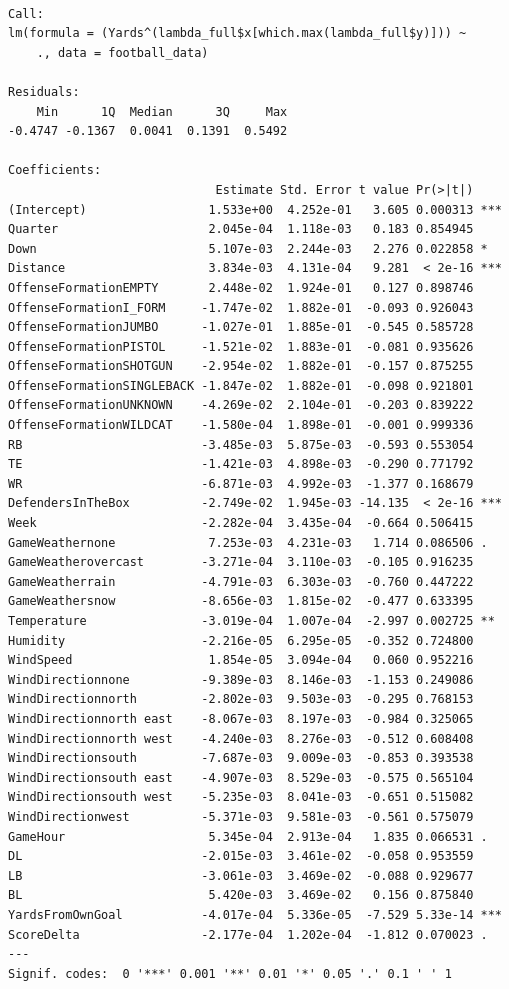 \documentclass[
  super,
  preprint,
  3p]{elsarticle}
\begin{document}
\begin{verbatim}

Call:
lm(formula = (Yards^(lambda_full$x[which.max(lambda_full$y)])) ~ 
    ., data = football_data)

Residuals:
    Min      1Q  Median      3Q     Max 
-0.4747 -0.1367  0.0041  0.1391  0.5492 

Coefficients:
                             Estimate Std. Error t value Pr(>|t|)    
(Intercept)                 1.533e+00  4.252e-01   3.605 0.000313 ***
Quarter                     2.045e-04  1.118e-03   0.183 0.854945    
Down                        5.107e-03  2.244e-03   2.276 0.022858 *  
Distance                    3.834e-03  4.131e-04   9.281  < 2e-16 ***
OffenseFormationEMPTY       2.448e-02  1.924e-01   0.127 0.898746    
OffenseFormationI_FORM     -1.747e-02  1.882e-01  -0.093 0.926043    
OffenseFormationJUMBO      -1.027e-01  1.885e-01  -0.545 0.585728    
OffenseFormationPISTOL     -1.521e-02  1.883e-01  -0.081 0.935626    
OffenseFormationSHOTGUN    -2.954e-02  1.882e-01  -0.157 0.875255    
OffenseFormationSINGLEBACK -1.847e-02  1.882e-01  -0.098 0.921801    
OffenseFormationUNKNOWN    -4.269e-02  2.104e-01  -0.203 0.839222    
OffenseFormationWILDCAT    -1.580e-04  1.898e-01  -0.001 0.999336    
RB                         -3.485e-03  5.875e-03  -0.593 0.553054    
TE                         -1.421e-03  4.898e-03  -0.290 0.771792    
WR                         -6.871e-03  4.992e-03  -1.377 0.168679    
DefendersInTheBox          -2.749e-02  1.945e-03 -14.135  < 2e-16 ***
Week                       -2.282e-04  3.435e-04  -0.664 0.506415    
GameWeathernone             7.253e-03  4.231e-03   1.714 0.086506 .  
GameWeatherovercast        -3.271e-04  3.110e-03  -0.105 0.916235    
GameWeatherrain            -4.791e-03  6.303e-03  -0.760 0.447222    
GameWeathersnow            -8.656e-03  1.815e-02  -0.477 0.633395    
Temperature                -3.019e-04  1.007e-04  -2.997 0.002725 ** 
Humidity                   -2.216e-05  6.295e-05  -0.352 0.724800    
WindSpeed                   1.854e-05  3.094e-04   0.060 0.952216    
WindDirectionnone          -9.389e-03  8.146e-03  -1.153 0.249086    
WindDirectionnorth         -2.802e-03  9.503e-03  -0.295 0.768153    
WindDirectionnorth east    -8.067e-03  8.197e-03  -0.984 0.325065    
WindDirectionnorth west    -4.240e-03  8.276e-03  -0.512 0.608408    
WindDirectionsouth         -7.687e-03  9.009e-03  -0.853 0.393538    
WindDirectionsouth east    -4.907e-03  8.529e-03  -0.575 0.565104    
WindDirectionsouth west    -5.235e-03  8.041e-03  -0.651 0.515082    
WindDirectionwest          -5.371e-03  9.581e-03  -0.561 0.575079    
GameHour                    5.345e-04  2.913e-04   1.835 0.066531 .  
DL                         -2.015e-03  3.461e-02  -0.058 0.953559    
LB                         -3.061e-03  3.469e-02  -0.088 0.929677    
BL                          5.420e-03  3.469e-02   0.156 0.875840    
YardsFromOwnGoal           -4.017e-04  5.336e-05  -7.529 5.33e-14 ***
ScoreDelta                 -2.177e-04  1.202e-04  -1.812 0.070023 .  
---
Signif. codes:  0 '***' 0.001 '**' 0.01 '*' 0.05 '.' 0.1 ' ' 1


\end{verbatim}
\end{document}
